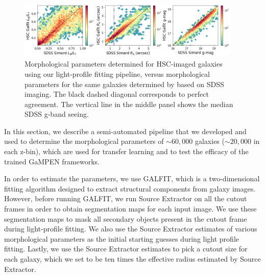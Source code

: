 \documentclass[linenumbers,twocolumn,twocolappendix]{aastex631}
\newcommand\gampen{GaMPEN}
\begin{document}
\begin{CJK*}{UTF8}{gbsn}
\begin{figure}[htb]
    \centering
    \includegraphics[width = 0.95\textwidth]{gfit_vs_simard.png}
    \caption{Morphological parameters determined for HSC-imaged galaxies using our light-profile fitting pipeline, versus morphological parameters for the same galaxies determined by \citet{simard_11} based on SDSS imaging. The black dashed diagonal corresponds to perfect agreement. The vertical line in the middle panel shows the median SDSS g-band seeing.}
    \label{fig:gfit_vs_simard}
\end{figure}

In this section, we describe a semi-automated pipeline that we developed and used to determine the morphological parameters of $\sim60,000$ galaxies ($\sim20,000$ in each z-bin), which are used for transfer learning and to test the efficacy of the trained \gampen{} frameworks.

In order to estimate the parameters, we use GALFIT, which is  a two-dimensional fitting algorithm designed to extract structural components from galaxy images. However, before running GALFIT, we run Source Extractor \citep{s_extract} on all the cutout frames in order to obtain segmentation maps for each input image. We use these segmentation maps to mask all secondary objects present in the cutout frame during light-profile fitting. We also use the Source Extractor estimates of various morphological parameters as the initial starting guesses during light profile fitting. Lastly, we use the Source Extractor estimates to pick a cutout size for each galaxy, which we set to be ten times the effective radius estimated by Source Extractor. 


\end{CJK*}
\end{document}
